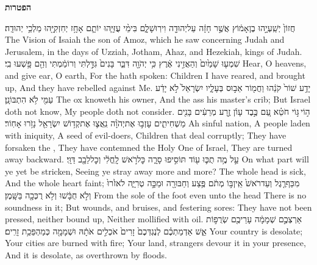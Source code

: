 \vspace{24pt}\LARGE \textbf{הפטרות} \normalsize\vspace{-16pt}
\label{haft_44}
\setcounter{chap}{1}
\setcounter{verse}{1}
{חֲזוֹן֙ יְשַֽׁעְיָ֣הוּ בֶן\maqqaf אָמ֔וֹץ אֲשֶׁ֣ר חָזָ֔ה עַל\maqqaf יְהוּדָ֖ה וִירֽוּשָׁלָ֑͏ִם בִּימֵ֨י עֻזִּיָּ֧הוּ יוֹתָ֛ם אָחָ֥ז יְחִזְקִיָּ֖הוּ מַלְכֵ֥י יְהוּדָֽה׃}
{The Vision of Isaiah the son of Amoz, which he saw concerning Judah and Jerusalem, in the days of Uzziah, Jotham, Ahaz, and Hezekiah, kings of Judah.}
{שִׁמְע֤וּ שָׁמַ֙יִם֙ וְהַאֲזִ֣ינִי אֶ֔רֶץ כִּ֥י יְהֹוָ֖ה דִּבֵּ֑ר בָּנִים֙ גִּדַּ֣לְתִּי וְרוֹמַ֔מְתִּי וְהֵ֖ם פָּ֥שְׁעוּ בִֽי׃}
{Hear, O heavens, and give ear, O earth, For the \lord\space hath spoken: Children I have reared, and brought up, And they have rebelled against Me.}
{יָדַ֥ע שׁוֹר֙ קֹנֵ֔הוּ וַחֲמ֖וֹר אֵב֣וּס בְּעָלָ֑יו יִשְׂרָאֵל֙ לֹ֣א יָדַ֔ע עַמִּ֖י לֹ֥א הִתְבּוֹנָֽן׃}
{The ox knoweth his owner, And the ass his master’s crib; But Israel doth not know, My people doth not consider.}
{ה֣וֹי \legarmeh  גּ֣וֹי חֹטֵ֗א עַ֚ם כֶּ֣בֶד עָוֺ֔ן זֶ֣רַע מְרֵעִ֔ים בָּנִ֖ים מַשְׁחִיתִ֑ים עָזְב֣וּ אֶת\maqqaf יְהֹוָ֗ה נִֽאֲצ֛וּ אֶת\maqqaf קְד֥וֹשׁ יִשְׂרָאֵ֖ל נָזֹ֥רוּ אָחֽוֹר׃}
{Ah sinful nation, A people laden with iniquity, A seed of evil-doers, Children that deal corruptly; They have forsaken the \lord, They have contemned the Holy One of Israel, They are turned away backward.}
{עַ֣ל מֶ֥ה תֻכּ֛וּ ע֖וֹד תּוֹסִ֣יפוּ סָרָ֑ה כׇּל\maqqaf רֹ֣אשׁ לׇֽחֳלִ֔י וְכׇל\maqqaf לֵבָ֖ב דַּוָּֽי׃}
{On what part will ye yet be stricken, Seeing ye stray away more and more? The whole head is sick, And the whole heart faint;}
{מִכַּף\maqqaf רֶ֤גֶל וְעַד\maqqaf רֹאשׁ֙ אֵֽין\maqqaf בּ֣וֹ מְתֹ֔ם פֶּ֥צַע וְחַבּוּרָ֖ה וּמַכָּ֣ה טְרִיָּ֑ה לֹא\maqqaf זֹ֙רוּ֙ וְלֹ֣א חֻבָּ֔שׁוּ וְלֹ֥א רֻכְּכָ֖ה בַּשָּֽׁמֶן׃}
{From the sole of the foot even unto the head There is no soundness in it; But wounds, and bruises, and festering sores: They have not been pressed, neither bound up, Neither mollified with oil.}
{אַרְצְכֶ֣ם שְׁמָמָ֔ה עָרֵיכֶ֖ם שְׂרֻפ֣וֹת אֵ֑שׁ אַדְמַתְכֶ֗ם לְנֶגְדְּכֶם֙ זָרִים֙ אֹכְלִ֣ים אֹתָ֔הּ וּשְׁמָמָ֖ה כְּמַהְפֵּכַ֥ת זָרִֽים׃}
{Your country is desolate; Your cities are burned with fire; Your land, strangers devour it in your presence, And it is desolate, as overthrown by floods.}
